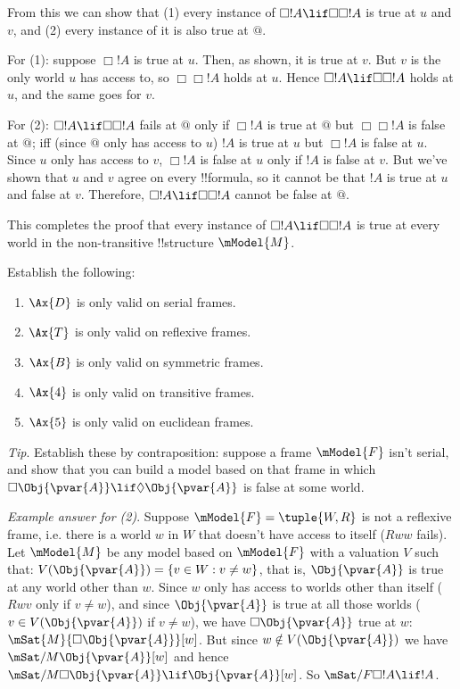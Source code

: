 \documentclass[../../../../include/open-logic-section]{subfiles}
\begin{document}
\begin{prob}
\begin{ans}
\begin{enumerate}
		From this we can show that (1) every instance of 
		$\Box!A\lif\Box\Box!A$ is true at $u$ and $v$, and (2) 
		every instance of it is also true at $@$.

		For (1): suppose $\Box!A$ is true at $u$. Then, 
		as shown, it is true at $v$. But $v$ is the only world $u$ 
		has access to, so $\Box\Box!A$ holds at $u$. Hence 
		$\Box!A\lif\Box\Box!A$ holds at $u$, and the same goes for $v$.

		For (2): $\Box!A\lif\Box\Box!A$ fails at $@$ only if $\Box!A$ 
		is true at $@$ but $\Box\Box!A$ is false at $@$; iff (since 
		$@$ only has access to $u$) $!A$ is true at $u$ but $\Box!A$ 
		is false at $u$. Since $u$ only has access to $v$, $\Box!A$
		is false at $u$ only if $!A$ is false at $v$. But we've shown
		that $u$ and $v$ agree on every !!{formula}, so it cannot be
		that $!A$ is true at $u$ and false at $v$. Therefore, 
		$\Box!A\lif\Box\Box!A$ cannot be false at $@$. 
		
		This completes the proof that every instance of
		$\Box!A\lif\Box\Box!A$ is true at every world in the
		non-transitive !!{structure} $\mModel{M}$. 
	\end{enumerate}
	
	\end{ans}

\end{prob}

\begin{prob}
Establish the following:
\begin{enumerate}
	\item $\Ax{D}$ is only valid on serial frames. 
	\item $\Ax{T}$ is only valid on reflexive frames.
	\item $\Ax{B}$ is only valid on symmetric frames.
	\item $\Ax{4}$ is only valid on transitive frames. 
	\item $\Ax{5}$ is only valid on euclidean frames.
\end{enumerate}

\emph{Tip}. Establish these by contraposition: suppose a
frame $\mModel{F}$ isn't serial, and show that you can
build a model based on that frame in which $\Box \Obj{\pvar{A}} 
\lif \Diamond \Obj{\pvar{A}}$ is false at some world.

\emph{Example answer for (2)}. Suppose $\mModel{F}=\tuple{W,R}$ 
is not a reflexive frame, i.e. there is a world $w$ in $W$ 
that doesn't have access to itself ($Rww$ fails). Let 
$\mModel{M}$ be any model based on $\mModel{F}$ with a valuation
$V$ such that: $V(\Obj{\pvar{A}}) = \{v\in W: v \not= w\}$, 
that is, $\Obj{\pvar{A}}$ is true at any world other than $w$. Since
$w$ only has access to worlds other than itself ($Rwv$ only 
if $v \not= w$), and since $\Obj{\pvar{A}}$ is true at all those worlds 
($v\in V(\Obj{\pvar{A}})$ if $v \not= w$), we have $\Box \Obj{\pvar{A}}$ true
at $w$: $\mSat{M}{\Box \Obj{\pvar{A}}}[w]$. But since $w \notin V(\Obj{\pvar{A}})$
we have $\mSat/{M}{\Obj{\pvar{A}}}[w]$ and hence
 $\mSat/{M}{\Box \Obj{\pvar{A}} \lif \Obj{\pvar{A}}}[w]$. So $\mSat/{F}{\Box !A \lif !A}$.

\end{prob}
\end{document}
